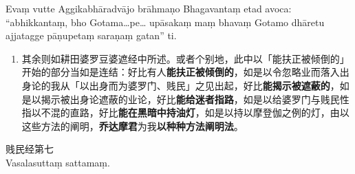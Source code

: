 Evaṃ vutte Aggikabhāradvājo brāhmaṇo Bhagavantaṃ etad avoca: “abhikkantaṃ, bho Gotama…pe… upāsakaṃ maṃ bhavaṃ Gotamo dhāretu ajjatagge pāṇupetaṃ saraṇaṃ gatan” ti.

\begin{enumerate}\item 其余则如耕田婆罗豆婆遮经中所述。或者个别地，此中以「能扶正被倾倒的」开始的部分当如是连结：好比有人\textbf{能扶正被倾倒的}，如是以令忽略业而落入出身论的我从「以出身而为婆罗门、贱民」之见出起，好比\textbf{能揭示被遮蔽的}，如是以揭示被出身论遮蔽的业论，好比\textbf{能给迷者指路}，如是以给婆罗门与贱民性指以不混的直路，好比\textbf{能在黑暗中持油灯}，如是以持以摩登伽之例的灯，由以这些方法的阐明，\textbf{乔达摩君}为我\textbf{以种种方法阐明法}。\end{enumerate}

\begin{center}\vspace{1em}贱民经第七\\Vasalasuttaṃ sattamaṃ.\end{center}

